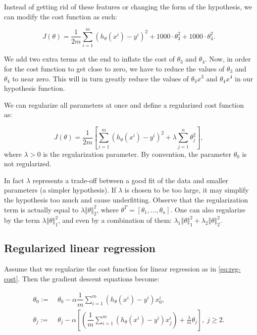 \documentclass[a4paper,11pt]{report}
\newcommand{\norm}[1]{\left\Vert#1\right\Vert}
\newcommand{\ds}{\displaystyle}
\begin{document}
Instead of getting rid of these features or changing the form of the hypothesis, we can modify the cost function as such:

$$J(\theta) = \ds \dfrac{1}{2m}\sum_{i=1}^m (h_\theta(x^i) - y^{i})^2 + 1000\cdot\theta_3^2 + 1000\cdot\theta_4^2.$$

We add two extra terms at the end to inflate the cost of $\theta_3$ and $\theta_4$. Now, in order for the cost function to get close to zero, we have to reduce the values of $\theta_3$ and $\theta_4$ to near zero. This will in turn greatly reduce the values of $\theta_3x^3$ and $\theta_4x^4$ in our hypothesis function.

We can regularize all parameters at once and define a regularized cost function as:

\begin{equation}\label{eq:reg-cost}
J(\theta) = \ds \dfrac{1}{2m} \left[ \sum_{i=1}^m (h_\theta(x^{i}) - y^{i})^2 + \lambda \sum_{j=1}^n \theta_j^2 \right],
\end{equation}
where $\lambda > 0$ is the regularization parameter. By convention, the parameter $\theta_0$ is not regularized.

In fact $\lambda$ represents a trade-off between a good fit of the data and smaller parameters (a simpler hypothesis). If $\lambda$ is chosen to be too large, it may simplify the hypothesis too much and cause underfitting. Observe that the regularization term is actually equal to $\lambda \norm{\theta}_2^2$, where $\theta^T = [\theta_1, \ldots, \theta_n]$. One can also regularize by the term $\lambda \norm{\theta}_1^2$, and even by a combination of them: $\lambda_1 \norm{\theta}_1^2 + \lambda_2 \norm{\theta}_2^2$.

\subsection*{Regularized linear regression}

Assume that we regularize the cost function for linear regression as in \eqref{eq:reg-cost}. Then the gradient descent equations become:

\begin{equation}\label{eq:mul-reg-gdreg}
\begin{split}
\theta_0 := & \; \theta_0 - \alpha \dfrac{1}{m} \sum_{i=1}^m (h_\theta(x^{i}) - y^{i})x_0^{i}, \\
\theta_j := & \; \theta_j - \alpha \left[ \left( \dfrac{1}{m}\sum_{i=1}^m (h_\theta(x^{i}) - y^{i})x_j^{i} \right) + \frac{\lambda}{m}\theta_j \right], \; j\geq 2. \\
\end{split}
\end{equation}
\end{document}
